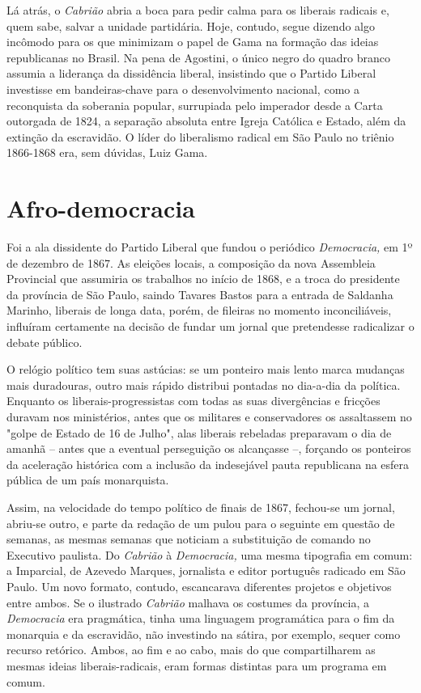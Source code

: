 Lá atrás, o \emph{Cabrião} abria a boca para pedir calma para os
liberais radicais e, quem sabe, salvar a unidade partidária. Hoje,
contudo, segue dizendo algo incômodo para os que minimizam o papel de
Gama na formação das ideias republicanas no Brasil. Na pena de Agostini,
o único negro do quadro branco assumia a liderança da dissidência
liberal, insistindo que o Partido Liberal investisse em bandeiras-chave
para o desenvolvimento nacional, como a reconquista da soberania
popular, surrupiada pelo imperador desde a Carta outorgada de 1824, a
separação absoluta entre Igreja Católica e Estado, além da extinção da
escravidão. O líder do liberalismo radical em São Paulo no triênio
1866-1868 era, sem dúvidas, Luiz Gama.

\section{Afro-democracia}

Foi a ala dissidente do Partido Liberal que fundou o periódico
\emph{Democracia,} em 1º de dezembro de 1867. As eleições locais, a
composição da nova Assembleia Provincial que assumiria os trabalhos no
início de 1868, e a troca do presidente da província de São Paulo,
saindo Tavares Bastos para a entrada de Saldanha Marinho, liberais de
longa data, porém, de fileiras no momento inconciliáveis, influíram
certamente na decisão de fundar um jornal que pretendesse radicalizar o
debate público.

O relógio político tem suas astúcias: se um ponteiro mais lento marca
mudanças mais duradouras, outro mais rápido distribui pontadas no
dia-a-dia da política. Enquanto os liberais-progressistas com todas as
suas divergências e fricções duravam nos ministérios, antes que os
militares e conservadores os assaltassem no "golpe de Estado de 16 de
Julho", alas liberais rebeladas preparavam o dia de amanhã -- antes que
a eventual perseguição os alcançasse --, forçando os ponteiros da
aceleração histórica com a inclusão da indesejável pauta republicana na
esfera pública de um país monarquista.

Assim, na velocidade do tempo político de finais de 1867, fechou-se um
jornal, abriu-se outro, e parte da redação de um pulou para o seguinte
em questão de semanas, as mesmas semanas que noticiam a substituição de
comando no Executivo paulista. Do \emph{Cabrião} à \emph{Democracia,}
uma mesma tipografia em comum: a Imparcial, de Azevedo Marques,
jornalista e editor português radicado em São Paulo. Um novo formato,
contudo, escancarava diferentes projetos e objetivos entre ambos. Se o
ilustrado \emph{Cabrião} malhava os costumes da província, a
\emph{Democracia} era pragmática, tinha uma linguagem programática para
o fim da monarquia e da escravidão, não investindo na sátira, por
exemplo, sequer como recurso retórico. Ambos, ao fim e ao cabo, mais do
que compartilharem as mesmas ideias liberais-radicais, eram formas
distintas para um programa em comum.

